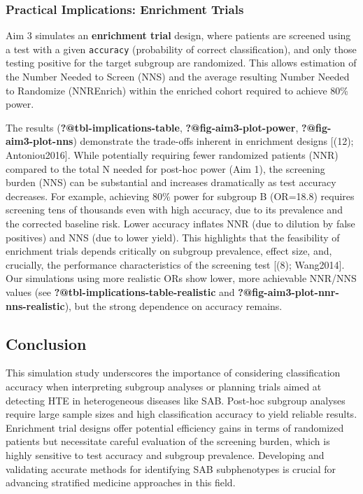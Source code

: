 \documentclass[
  letterpaper,
  DIV=11,
  numbers=noendperiod]{scrartcl}
\begin{document}
\subsubsection{Practical Implications: Enrichment
Trials}\label{practical-implications-enrichment-trials}

Aim 3 simulates an \textbf{enrichment trial} design, where patients are
screened using a test with a given \texttt{accuracy} (probability of
correct classification), and only those testing positive for the target
subgroup are randomized. This allows estimation of the Number Needed to
Screen (NNS) and the average resulting Number Needed to Randomize
(NNREnrich) within the enriched cohort required to achieve 80\% power.

The results (\textbf{?@tbl-implications-table},
\textbf{?@fig-aim3-plot-power}, \textbf{?@fig-aim3-plot-nns})
demonstrate the trade-offs inherent in enrichment designs {[}(12);
Antoniou2016{]}. While potentially requiring fewer randomized patients
(NNR) compared to the total N needed for post-hoc power (Aim 1), the
screening burden (NNS) can be substantial and increases dramatically as
test accuracy decreases. For example, achieving 80\% power for subgroup
B (OR=18.8) requires screening tens of thousands even with high
accuracy, due to its prevalence and the corrected baseline risk. Lower
accuracy inflates NNR (due to dilution by false positives) and NNS (due
to lower yield). This highlights that the feasibility of enrichment
trials depends critically on subgroup prevalence, effect size, and,
crucially, the performance characteristics of the screening test {[}(8);
Wang2014{]}. Our simulations using more realistic ORs show lower, more
achievable NNR/NNS values (see
\textbf{?@tbl-implications-table-realistic} and
\textbf{?@fig-aim3-plot-nnr-nns-realistic}), but the strong dependence
on accuracy remains.

\subsection{Conclusion}\label{conclusion}

This simulation study underscores the importance of considering
classification accuracy when interpreting subgroup analyses or planning
trials aimed at detecting HTE in heterogeneous diseases like SAB.
Post-hoc subgroup analyses require large sample sizes and high
classification accuracy to yield reliable results. Enrichment trial
designs offer potential efficiency gains in terms of randomized patients
but necessitate careful evaluation of the screening burden, which is
highly sensitive to test accuracy and subgroup prevalence. Developing
and validating accurate methods for identifying SAB subphenotypes is
crucial for advancing stratified medicine approaches in this field.
\end{document}
